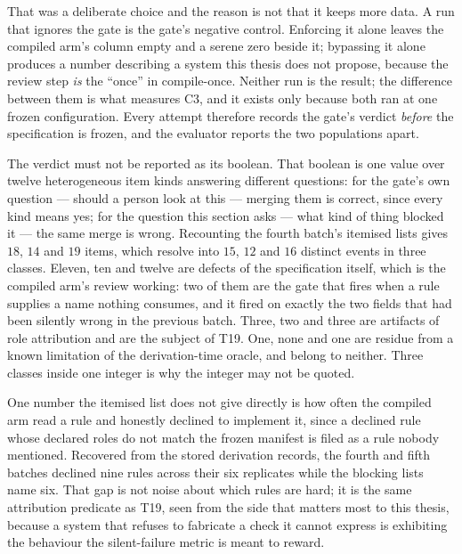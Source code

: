 That was a deliberate choice and the reason is not that it keeps more data. A run that ignores
the gate is the gate's negative control. Enforcing it alone leaves the compiled arm's column
empty and a serene zero beside it; bypassing it alone produces a number describing a system this
thesis does not propose, because the review step \emph{is} the ``once'' in compile-once. Neither
run is the result; the difference between them is what measures C3, and it exists only because
both ran at one frozen configuration. Every attempt therefore records the gate's verdict
\emph{before} the specification is frozen, and the evaluator reports the two populations apart.

The verdict must not be reported as its boolean. That boolean is one value over twelve
heterogeneous item kinds answering different questions: for the gate's own question --- should a
person look at this --- merging them is correct, since every kind means yes; for the question
this section asks --- what kind of thing blocked it --- the same merge is wrong. Recounting the
fourth batch's itemised lists gives $18$, $14$ and $19$ items, which resolve into $15$, $12$ and
$16$ distinct events in three classes. Eleven, ten and twelve are defects of the specification
itself, which is the compiled arm's review working: two of them are the gate that fires when a
rule supplies a name nothing consumes, and it fired on exactly the two fields that had been
silently wrong in the previous batch. Three, two and three are artifacts of role attribution and
are the subject of T19. One, none and one are residue from a known limitation of the
derivation-time oracle, and belong to neither. Three classes inside one integer is why the
integer may not be quoted.

One number the itemised list does not give directly is how often the compiled arm read a rule
and honestly declined to implement it, since a declined rule whose declared roles do not match
the frozen manifest is filed as a rule nobody mentioned. Recovered from the stored derivation
records, the fourth and fifth batches declined nine rules across their six replicates while the
blocking lists name six. That gap is not noise about which rules are hard; it is the same
attribution predicate as T19, seen from the side that matters most to this thesis, because a
system that refuses to fabricate a check it cannot express is exhibiting the behaviour the
silent-failure metric is meant to reward.

